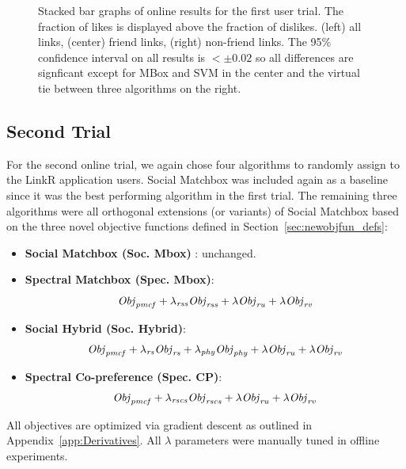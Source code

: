 \begin{figure}[t!]
\caption{Stacked bar graphs of online results for the first 
user trial.  The fraction of likes is displayed above 
the fraction of dislikes.  (left) all links, (center) friend links,
(right) non-friend links.  The 95\% confidence interval on all 
results is $< \pm 0.02$ so all differences are signficant
except for MBox and SVM in the center and the virtual tie
between three algorithms on the right.}
\label{fig:OnlineResult1}
\end{figure}


\subsection{Second Trial} 

For the second online trial, we again chose four algorithms to
randomly assign to the LinkR application users.  Social Matchbox
was included again as a baseline since it was the best performing
algorithm in the first trial.  The remaining three algorithms
were all orthogonal extensions (or variants) of Social Matchbox
based on the three novel objective functions defined in 
Section~\ref{sec:newobjfun_defs}:
\begin{itemize}
\item {\bf Social Matchbox (Soc. Mbox)} : unchanged.
\item {\bf Spectral Matchbox (Spec. Mbox)}: 
$$\mathit{Obj}_{\mathit{pmcf}} + \lambda_{\mathit{rss}} \mathit{Obj}_{\mathit{rss}} + \lambda \mathit{Obj}_{\mathit{ru}} + \lambda \mathit{Obj}_{\mathit{rv}}$$
\item {\bf Social Hybrid (Soc. Hybrid)}: 
$$\mathit{Obj}_{\mathit{pmcf}} + \lambda_{\mathit{rs}} \mathit{Obj}_{\mathit{rs}} + \lambda_{\mathit{phy}} \mathit{Obj}_{\mathit{phy}} + \lambda \mathit{Obj}_{\mathit{ru}} + \lambda \mathit{Obj}_{\mathit{rv}}$$
\item {\bf Spectral Co-preference (Spec. CP)}: 
$$\mathit{Obj}_{\mathit{pmcf}} + \lambda_{\mathit{rscs}} \mathit{Obj}_{\mathit{rscs}} + \lambda \mathit{Obj}_{\mathit{ru}} + \lambda \mathit{Obj}_{\mathit{rv}}$$
\end{itemize}
All objectives are optimized via gradient descent as outlined
in Appendix~\ref{app:Derivatives}.  
All $\lambda$ parameters were manually tuned in offline experiments.


